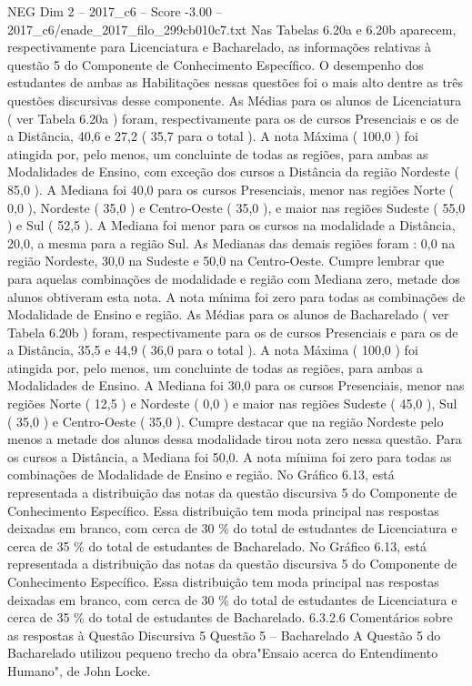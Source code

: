 \begin{textsample}{NEG Dim 2 – 2017\_c6 – Score -3.00 – 2017\_c6/enade\_2017\_filo\_299cb010c7.txt}
Nas Tabelas 6.20a e 6.20b aparecem, respectivamente para Licenciatura e Bacharelado, as informações relativas à questão 5 do Componente de Conhecimento Específico.
O desempenho dos estudantes de ambas as Habilitações nessas questões foi o mais alto dentre as três questões discursivas desse componente.
As Médias para os alunos de Licenciatura ( ver Tabela 6.20a ) foram, respectivamente para os de cursos Presenciais e os de a Distância, 40,6 e 27,2 ( 35,7 para o total ).
A nota Máxima ( 100,0 ) foi atingida por, pelo menos, um concluinte de todas as regiões, para ambas as Modalidades de Ensino, com exceção dos cursos a Distância da região Nordeste ( 85,0 ).
A Mediana foi 40,0 para os cursos Presenciais, menor nas regiões Norte ( 0,0 ), Nordeste ( 35,0 ) e Centro-Oeste ( 35,0 ), e maior nas regiões Sudeste ( 55,0 ) e Sul ( 52,5 ).
A Mediana foi menor para os cursos na modalidade a Distância, 20,0, a mesma para a região Sul.
As Medianas das demais regiões foram : 0,0 na região Nordeste, 30,0 na Sudeste e 50,0 na Centro-Oeste.
Cumpre lembrar que para aquelas combinações de modalidade e região com Mediana zero, metade dos alunos obtiveram esta nota.
A nota mínima foi zero para todas as combinações de Modalidade de Ensino e região.
As Médias para os alunos de Bacharelado ( ver Tabela 6.20b ) foram, respectivamente para os de cursos Presenciais e para os de a Distância, 35,5 e 44,9 ( 36,0 para o total ).
A nota Máxima ( 100,0 ) foi atingida por, pelo menos, um concluinte de todas as regiões, para ambas a Modalidades de Ensino.
A Mediana foi 30,0 para os cursos Presenciais, menor nas regiões Norte ( 12,5 ) e Nordeste ( 0,0 ) e maior nas regiões Sudeste ( 45,0 ), Sul ( 35,0 ) e Centro-Oeste ( 35,0 ).
Cumpre destacar que na região Nordeste pelo menos a metade dos alunos dessa modalidade tirou nota zero nessa questão.
Para os cursos a Distância, a Mediana foi 50,0.
A nota mínima foi zero para todas as combinações de Modalidade de Ensino e região.
No Gráfico 6.13, está representada a distribuição das notas da questão discursiva 5 do Componente de Conhecimento Específico.
Essa distribuição tem moda principal nas respostas deixadas em branco, com cerca de 30 \% do total de estudantes de Licenciatura e cerca de 35 \% do total de estudantes de Bacharelado.
No Gráfico 6.13, está representada a distribuição das notas da questão discursiva 5 do Componente de Conhecimento Específico.
Essa distribuição tem moda principal nas respostas deixadas em branco, com cerca de 30 \% do total de estudantes de Licenciatura e cerca de 35 \% do total de estudantes de Bacharelado. 6.3.2.6 Comentários sobre as respostas à Questão Discursiva 5 Questão 5 – Bacharelado A Questão 5 do Bacharelado utilizou pequeno trecho da obra"Ensaio acerca do Entendimento Humano", de John Locke.

\end{textsample}
